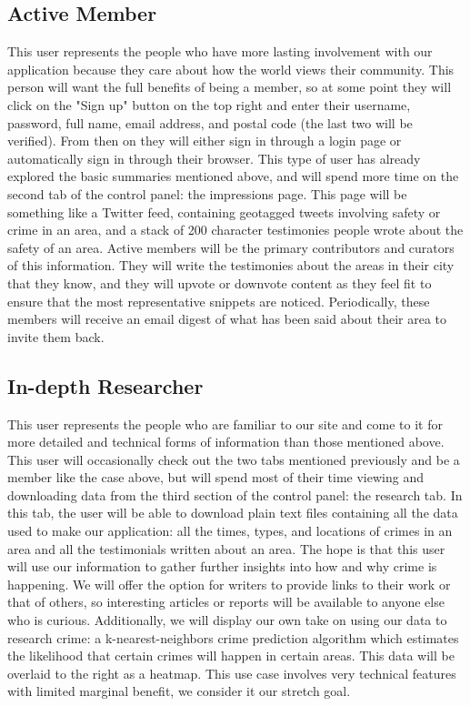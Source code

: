 \documentclass[paper=a4, fontsize=11pt]{scrartcl} %
\numberwithin{equation}{section} %
\numberwithin{figure}{section} %
\numberwithin{table}{section} %
\begin{document}

\subsection{Active Member}

This user represents the people who have more lasting involvement with our application because they care about how the world views their community. This person will want the full benefits of being a member, so at some point they will click on the "Sign up" button on the top right and enter their username, password, full name, email address, and postal code (the last two will be verified). From then on they will either sign in through a login page or automatically sign in through their browser. This type of user has already explored the basic summaries mentioned above, and will spend more time on the second tab of the control panel: the impressions page. This page will be something like a Twitter feed, containing geotagged tweets involving safety or crime in an area, and a stack of 200 character testimonies people wrote about the safety of an area. Active members will be the primary contributors and curators of this information. They will write the testimonies about the areas in their city that they know, and they will upvote or downvote content as they feel fit to ensure that the most representative snippets are noticed. Periodically, these members will receive an email digest of what has been said about their area to invite them back.


\subsection{In-depth Researcher}

This user represents the people who are familiar to our site and come to it for more detailed and technical forms of information than those mentioned above. This user will occasionally check out the two tabs mentioned previously and be a member like the case above, but will spend most of their time viewing and downloading data from the third section of the control panel: the research tab. In this tab, the user will be able to download plain text files containing all the data used to make our application: all the times, types, and locations of crimes in an area and all the testimonials written about an area. The hope is that this user will use our information to gather further insights into how and why crime is happening. We will offer the option for writers to provide links to their work or that of others, so interesting articles or reports will be available to anyone else who is curious. Additionally, we will display our own take on using our data to research crime: a k-nearest-neighbors crime prediction algorithm which estimates the likelihood that certain crimes will happen in certain areas. This data will be overlaid to the right as a heatmap. This use case involves very technical features with limited marginal benefit, we consider it our stretch goal.
\end{document}
